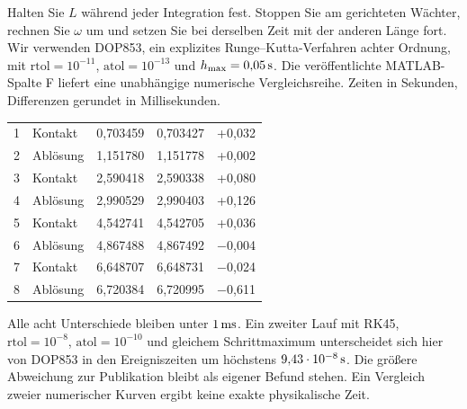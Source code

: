 Halten Sie \(L\) während jeder Integration fest. Stoppen Sie am gerichteten Wächter, rechnen Sie \(\omega\) um und setzen Sie bei derselben Zeit mit der anderen Länge fort. Wir verwenden DOP853, ein explizites Runge--Kutta-Verfahren achter Ordnung, mit \(\mathrm{rtol}=10^{-11}\), \(\mathrm{atol}=10^{-13}\) und \(h_\mathrm{max}=0{,}05\,\mathrm{s}\). Die veröffentlichte MATLAB-Spalte F liefert eine unabhängige numerische Vergleichsreihe. Zeiten in Sekunden, Differenzen gerundet in Millisekunden.
{\tblstart\begin{tabularx}{\linewidth}{@{}rYrrr@{}}\toprule
{}&&&&\\&Kontakt&0,703459&0,703427&+0,032\\
2&Ablösung&1,151780&1,151778&+0,002\\
3&Kontakt&2,590418&2,590338&+0,080\\
4&Ablösung&2,990529&2,990403&+0,126\\
5&Kontakt&4,542741&4,542705&+0,036\\
6&Ablösung&4,867488&4,867492&$-$0,004\\
7&Kontakt&6,648707&6,648731&$-$0,024\\
8&Ablösung&6,720384&6,720995&$-$0,611\\\bottomrule\end{tabularx}\par}
Alle acht Unterschiede bleiben unter \(1\,\mathrm{ms}\). Ein zweiter Lauf mit RK45, \(\mathrm{rtol}=10^{-8}\), \(\mathrm{atol}=10^{-10}\) und gleichem Schrittmaximum unterscheidet sich hier von DOP853 in den Ereigniszeiten um höchstens \(9{,}43\cdot10^{-8}\,\mathrm{s}\). Die größere Abweichung zur Publikation bleibt als eigener Befund stehen. Ein Vergleich zweier numerischer Kurven ergibt keine exakte physikalische Zeit.

